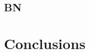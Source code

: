 \documentclass[aps,prb,twocolumn,amsmath,amssymb,superscriptaddress,longbibliography]{revtex4-1}
\newcommand{\Ns}{\mathbb{N}^{*}}
\newcommand{\C}{\mathbb{C}}
\begin{document}




 



\subsection*{BN}






\section{Conclusions} 
\end{document}
